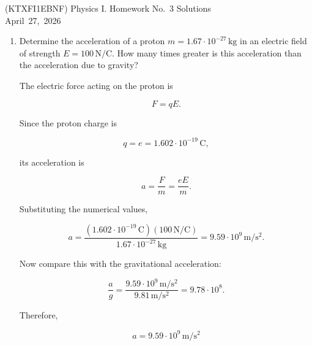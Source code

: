 \documentclass[a4paper,12pt]{letter}
\begin{document}
\begin{center}
(KTXFI1EBNF) Physics I. Homework No.~3 Solutions\\[0.2cm]
April~27,~2026
\end{center}

\bigskip

\begin{enumerate}


\item Determine the acceleration of a proton $m = 1.67\cdot10^{-27}\,\mathrm{kg}$ in an electric field of strength $E = 100\,\mathrm{N/C}$. How many times greater is this acceleration than the acceleration due to gravity?

\begin{center}
\end{center}
  

The electric force acting on the proton is

$$F=qE.$$

Since the proton charge is

$$q=e=1.602\cdot10^{-19}\,\mathrm{C},$$

its acceleration is

$$a=\frac{F}{m}=\frac{eE}{m}.$$

Substituting the numerical values,

$$a=\frac{(1.602\cdot10^{-19}\,\mathrm{C})(100\,\mathrm{N/C})}{1.67\cdot10^{-27}\,\mathrm{kg}}=9.59\cdot10^9\,\mathrm{m/s^2}.$$

Now compare this with the gravitational acceleration:

$$\frac{a}{g}=
\frac{9.59\cdot10^9\,\mathrm{m/s^2}}{9.81\,\mathrm{m/s^2}}=9.78\cdot10^8.$$

Therefore,

$$\boxed{a=9.59\cdot10^9\,\mathrm{m/s^2}}$$


\end{enumerate}
\end{document}
